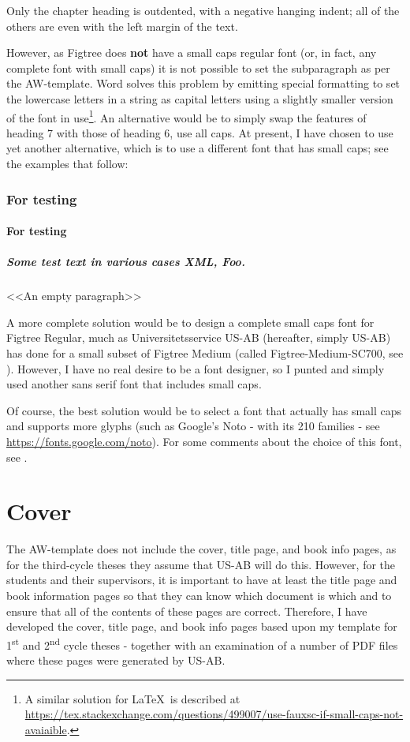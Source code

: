\documentclass[12pt, twoside]{article}
\begin{document}
Only the chapter heading is outdented, \ie with a negative hanging indent; all of the others are even with the left margin of the text.

However, as Figtree does \textbf{not} have a small caps regular font (or, in fact, any complete font with small caps) it is not possible to set the subparagraph as per the AW-template. Word solves this problem by emitting special formatting to set the lowercase letters in a string as capital letters using a slightly smaller version of the font in use\footnote{A similar solution for \LaTeX\ is described at \url{https://tex.stackexchange.com/questions/499007/use-fauxsc-if-small-caps-not-avaiaible}.}. An alternative would be to simply swap the features of heading 7 with those of heading 6, \ie use all caps. At present, I have chosen to use yet another alternative, which is to use a different font that has small caps; see the examples that follow:
\subsubsection{For testing}
\paragraph{For testing}
\subparagraph{Some test text in various cases XML, Foo.}
<<An empty paragraph>>\\
\vspace{0.5cm}

A more complete solution would be to design a complete small caps font for Figtree Regular, much as \foreignlanguage{swedish}{Universitetsservice US-AB} (hereafter, simply US-AB) has done for a small subset of Figtree Medium (called Figtree-Medium-SC700, see ).  However, I have no real desire to be a font designer, so I punted and simply used another sans serif font that includes small caps.

Of course, the best solution would be to select a font that actually has small caps and supports more glyphs (such as Google's Noto - with its 210 families - see \url{https://fonts.google.com/noto}). For some comments about the choice of this font, see .



\section{Cover}
\label{sec:cycle3cover}
The AW-template does not include the cover, title page, and book info pages, as for the third-cycle theses they assume that US-AB will do this. However, for the students and their supervisors, it is important to have at least the title page and book information pages so that they can know which document is which and to ensure that all of the contents of these pages are correct. Therefore, I have developed the cover, title page, and book info pages based upon my template for 1\textsuperscript{st} and 2\textsuperscript{nd} cycle theses - together with an examination of a number of PDF files where these pages were generated by US-AB.
\end{document}

